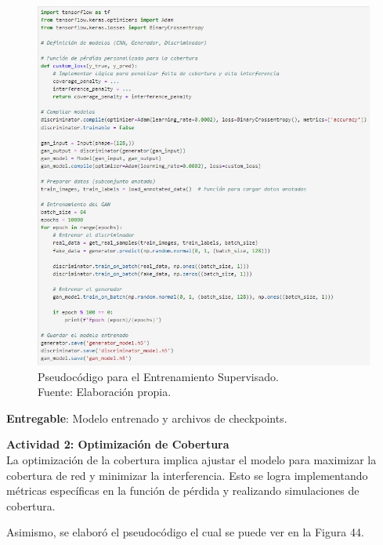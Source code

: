 \begin{figure}[H]
	\centering
	\includegraphics[width=1\textwidth]{3/figures/pseudo_train.jpg}
	\caption[Pseudocódigo para el Entrenamiento Supervisado]{Pseudocódigo para el Entrenamiento Supervisado.\\ Fuente: Elaboración propia.}
	\label{3:8}
\end{figure}

\textbf{Entregable}: Modelo entrenado y archivos de checkpoints.

\textbf{Actividad 2: Optimización de Cobertura}
\\
La optimización de la cobertura implica ajustar el modelo para maximizar la cobertura de red y minimizar la interferencia. Esto se logra implementando métricas específicas en la función de pérdida y realizando simulaciones de cobertura.

Asimismo, se elaboró el pseudocódigo el cual se puede ver en la Figura 44.

